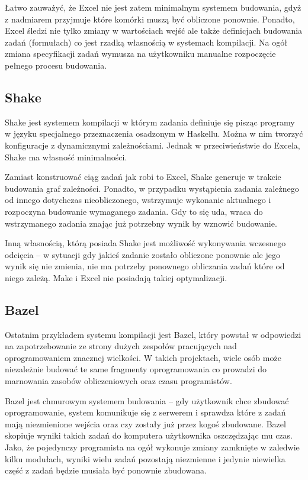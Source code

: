 Łatwo zauważyć, że Excel nie jest zatem minimalnym systemem budowania, gdyż z nadmiarem przyjmuje które komórki muszą być obliczone ponownie. Ponadto, Excel śledzi nie tylko zmiany w wartościach wejść ale także definicjach budowania zadań (formułach) co jest rzadką własnością w systemach kompilacji. Na ogół zmiana specyfikacji zadań wymusza na użytkowniku manualne rozpoczęcie pełnego procesu budowania.

\subsection{Shake}

Shake jest systemem kompilacji w którym zadania definiuje się pisząc programy w języku specjalnego przeznaczenia osadzonym w Haskellu. Można w nim tworzyć konfiguracje z dynamicznymi zależnościami. Jednak w przeciwieństwie do Excela, Shake ma własność minimalności.

Zamiast konstruować ciąg zadań jak robi to Excel, Shake generuje w trakcie budowania graf zależności. Ponadto, w przypadku wystąpienia zadania zależnego od innego dotychczas nieobliczonego, wstrzymuje wykonanie aktualnego i rozpoczyna budowanie wymaganego zadania. Gdy to się uda, wraca do wstrzymanego zadania znając już potrzebny wynik by wznowić budowanie.

Inną własnością, którą posiada Shake jest możliwość wykonywania wczesnego odcięcia -- w sytuacji gdy jakieś zadanie zostało obliczone ponownie ale jego wynik się nie zmienia, nie ma potrzeby ponownego obliczania zadań które od niego zależą. Make i Excel nie posiadają takiej optymalizacji.

\subsection{Bazel}

Ostatnim przykładem systemu kompilacji jest Bazel, który powstał w odpowiedzi na zapotrzebowanie ze strony dużych zespołów pracujących nad oprogramowaniem znacznej wielkości. W takich projektach, wiele osób może niezależnie budować te same fragmenty oprogramowania co prowadzi do marnowania zasobów obliczeniowych oraz czasu programistów.

Bazel jest chmurowym systemem budowania -- gdy użytkownik chce zbudować oprogramowanie, system komunikuje się z serwerem i sprawdza które z zadań mają niezmienione wejścia oraz czy zostały już przez kogoś zbudowane. Bazel skopiuje wyniki takich zadań do komputera użytkownika oszczędzając mu czas. Jako, że pojedynczy programista na ogół wykonuje zmiany zamknięte w zaledwie kilku modułach, wyniki wielu zadań pozostają niezmienne i jedynie niewielka część z zadań będzie musiała być ponownie zbudowana.

